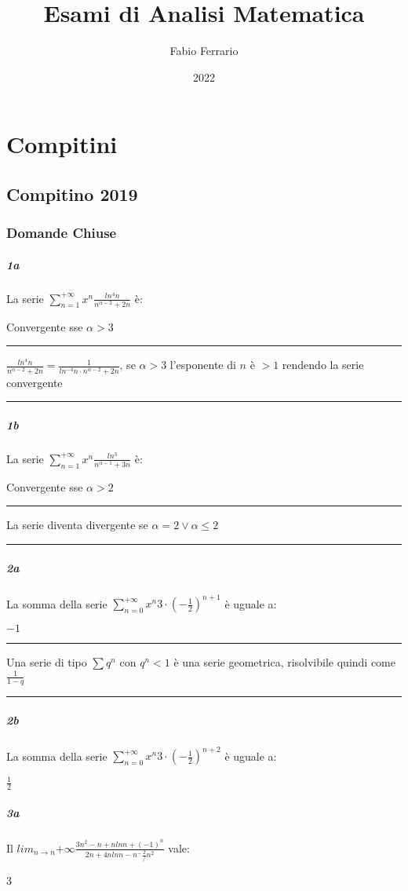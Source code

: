 \documentclass[12pt, a4paper, openany]{book}
\newcommand{\defaultrule}{\par\noindent\rule{\textwidth}{0.1pt}}
\newcommand{\serie}[2]{\sum_{n=#1}^{#2} x^n}
\newcommand{\limite}[2][n]{lim_{#1 \rightarrow #2}}
\newcommand{\domanda}[2]{\paragraph*{#1}#2:}
\newcommand{\risposta}[1]{\begin{center}#1 \end{center}}
\newcommand{\spiegazione}[1]{\defaultrule \par #1 \defaultrule}
\begin{document}
\title{Esami di Analisi Matematica}
\author{Fabio Ferrario}
\date{2022}
\maketitle

\tableofcontents
\chapter{Compitini}
\section{Compitino 2019}
\subsection{Domande Chiuse}

\domanda{1a}{La serie $\serie{1}{+\infty} \frac{ln^4n}{n^{\alpha - 2} + 2n}$ è}
\risposta{Convergente sse $\alpha > 3$}
\spiegazione{
    $\frac{ln^4n}{n^{\alpha - 2} + 2n} = \frac{1}{ln^{-4}n\cdot n^{\alpha-2}+2n} $,  se $\alpha >3$ l'esponente di $n$ è $>1$ rendendo la serie convergente
}

\domanda{1b}{La serie $\serie{1}{+\infty} \frac{ln^3}{n^{\alpha - 1} + 3n}$ è}
\risposta{Convergente sse $\alpha > 2$}
\spiegazione{La serie diventa divergente se $\alpha = 2 \lor \alpha \leq 2$}

\domanda{2a}{La somma della serie $\serie{0}{+\infty} 3\cdot (-\frac{1}{2})^{n+1}$ è uguale a}
\risposta{$-1$}
\spiegazione{
    Una serie di tipo $\sum q^n$ con $q^n < 1$ è una serie geometrica, risolvibile quindi come $\frac{1}{1-q}$
}
\domanda{2b}{La somma della serie $\serie{0}{+\infty} 3\cdot (-\frac{1}{2})^{n+2}$ è uguale a}
\risposta{$\frac{1}{2}$}

\domanda{3a}{Il $\limite{n}{+\infty} \frac{3n^2-n+n ln n +(-1)^n}{2n+4n ln n - n^ - \frac 2/n^2}$ vale}
\risposta{3}
 
\end{document}
